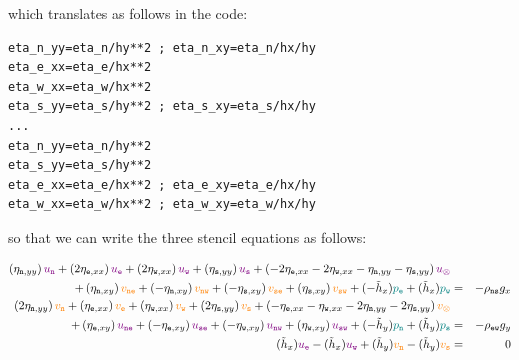which translates as follows in the code:

\begin{lstlisting}
eta_n_yy=eta_n/hy**2 ; eta_n_xy=eta_n/hx/hy
eta_e_xx=eta_e/hx**2
eta_w_xx=eta_w/hx**2
eta_s_yy=eta_s/hy**2 ; eta_s_xy=eta_s/hx/hy
...
eta_n_yy=eta_n/hy**2
eta_s_yy=eta_s/hy**2
eta_e_xx=eta_e/hx**2 ; eta_e_xy=eta_e/hx/hy
eta_w_xx=eta_w/hx**2 ; eta_w_xy=eta_w/hx/hy
\end{lstlisting}

so that we can write the three stencil equations as follows:

\begin{eqnarray}
\left( \eta_{{\tt n},yy} \right) {\color{violet} u_{\tt n}} + 
\left( 2\eta_{{\tt e},xx} \right) {\color{violet} u_{\tt e}} + 
\left( 2\eta_{{\tt w},xx} \right) {\color{violet} u_{\tt w}} + 
\left( \eta_{{\tt s},yy} \right) {\color{violet} u_{\tt s}} + 
\left( -2\eta_{{\tt e},xx} - 2\eta_{{\tt w},xx}
-\eta_{{\tt n},yy} -\eta_{{\tt s},yy}
\right) {\color{violet} u_\otimes} \nonumber\\
+
\left( \eta_{{\tt n},xy} \right) {\color{orange} v_{\tt ne}}+ 
\left(-\eta_{{\tt n},xy} \right) {\color{orange} v_{\tt nw}}+ 
\left(-\eta_{{\tt s},xy} \right) {\color{orange} v_{\tt se}}+ 
\left( \eta_{{\tt s},xy} \right) {\color{orange} v_{\tt sw}} 
+(- \tilde{h}_x) {\color{teal}p_{\tt e}} + (\tilde{h}_x ){\color{teal}p_{\tt w}} 
&=& -\rho_{\tt ns} g_x 
\nonumber\\
\left( 2\eta_{{\tt n},yy} \right) {\color{orange} v_{\tt n}} +
\left(  \eta_{{\tt e},xx} \right) {\color{orange} v_{\tt e}} +
\left(  \eta_{{\tt w},xx} \right) {\color{orange} v_{\tt w}} +
\left( 2\eta_{{\tt s},yy} \right) {\color{orange} v_{\tt s}} +
\left( 
-\eta_{{\tt e},xx}
-\eta_{{\tt w},xx}
-2\eta_{{\tt n},yy}
-2\eta_{{\tt s},yy}
\right) {\color{orange} v_\otimes} \nonumber\\
+
\left( \eta_{{\tt e},xy} \right) {\color{violet} u_{\tt ne}} +
\left(-\eta_{{\tt e},xy} \right) {\color{violet} u_{\tt se}} +
\left(-\eta_{{\tt w},xy} \right) {\color{violet} u_{\tt nw}} +
\left( \eta_{{\tt w},xy} \right) {\color{violet} u_{\tt sw}} 
+(-\tilde{h}_y ){\color{teal}p_{\tt n}} + (\tilde{h}_y) {\color{teal}p_{\tt s}}
&=& -\rho_{\tt ew} g_y \nonumber\\
(\tilde{h}_x) {\color{violet}u_{\tt e}}- 
(\tilde{h}_x) {\color{violet}u_{\tt w}}
+
(\tilde{h}_y) {\color{orange}v_{\tt n}}- 
(\tilde{h}_y){\color{orange}v_{\tt s}} &=&0 \nonumber
\end{eqnarray}












